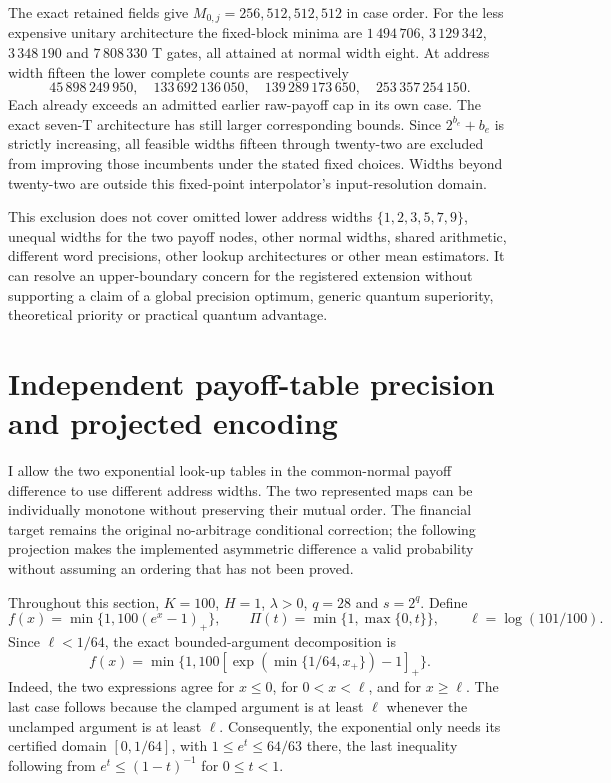 \documentclass[11pt]{article}
\begin{document}
The exact retained fields give $M_{0,j}=256,512,512,512$ in case order.
For the less expensive unitary architecture the fixed-block minima are
$1\,494\,706$, $3\,129\,342$, $3\,348\,190$ and $7\,808\,330$ T gates,
all attained at normal width eight. At address width fifteen the lower
complete counts are respectively
\begin{equation}
45\,898\,249\,950,\quad133\,692\,136\,050,\quad
139\,289\,173\,650,\quad253\,357\,254\,150.
\end{equation}
Each already exceeds an admitted earlier raw-payoff cap in its own case.
The exact seven-T architecture has still larger corresponding bounds.
Since $2^{b_e}+b_e$ is strictly increasing, all feasible widths fifteen
through twenty-two are excluded from improving those incumbents under
the stated fixed choices. Widths beyond twenty-two are outside this
fixed-point interpolator's input-resolution domain.

This exclusion does not cover omitted lower address widths
$\{1,2,3,5,7,9\}$, unequal widths for the two payoff nodes, other normal
widths, shared arithmetic, different word precisions, other lookup
architectures or other mean estimators. It can resolve an upper-boundary
concern for the registered extension without supporting a claim of a
global precision optimum, generic quantum superiority, theoretical
priority or practical quantum advantage.

\section{Independent payoff-table precision and projected encoding}
\label{sec:raw-asymmetric-projection}

I allow the two exponential look-up tables in the common-normal payoff
difference to use different address widths. The two represented maps can
be individually monotone without preserving their mutual order. The
financial target remains the original no-arbitrage conditional correction;
the following projection makes the implemented asymmetric difference a
valid probability without assuming an ordering that has not been proved.

Throughout this section, $K=100$, $H=1$, $\lambda>0$, $q=28$ and
$s=2^q$. Define
\begin{equation}
 f(x)=\min\{1,100(e^x-1)_+\},\qquad
 \Pi(t)=\min\{1,\max\{0,t\}\},\qquad
 \ell=\log(101/100).
\end{equation}
Since $\ell<1/64$, the exact bounded-argument decomposition is
\begin{equation}
 f(x)=\min\{1,100[\exp(\min\{1/64,x_+\})-1]_+\}.
\end{equation}
Indeed, the two expressions agree for $x\leq0$, for
$0<x<\ell$, and for $x\geq\ell$. The last case follows because
the clamped argument is at least $\ell$ whenever the unclamped
argument is at least $\ell$. Consequently, the exponential only needs
its certified domain $[0,1/64]$, with
$1\leq e^t\leq64/63$ there, the last inequality following from
$e^t\leq(1-t)^{-1}$ for $0\leq t<1$.
\end{document}
